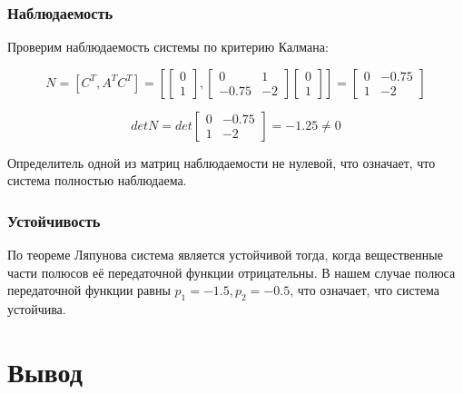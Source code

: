 \documentclass[14pt,a4paper,report]{report}
\begin{document}
\subsubsection{Наблюдаемость}

Проверим наблюдаемость системы по критерию Калмана:

\begin{equation*}
\text{$N=[C^T,A^TC^T]=[\begin{bmatrix} 0 \\ 1 \end{bmatrix},\begin{bmatrix} 0 & 1 \\ -0.75 & -2 \end{bmatrix}\begin{bmatrix} 0 \\ 1 \end{bmatrix}]=\begin{bmatrix} 0 & -0.75 \\ 1 & -2 \end{bmatrix}$}
\end{equation*}

\begin{equation*}
\text{$detN=det\begin{bmatrix} 0 & -0.75 \\ 1 & -2 \end{bmatrix}=-1.25\neq 0$}
\end{equation*}

Определитель одной из матриц наблюдаемости не нулевой, что означает, что система полностью наблюдаема.

\subsubsection{Устойчивость}

По теореме Ляпунова система является устойчивой тогда, когда вещественные части полюсов её передаточной функции отрицательны. В нашем случае полюса передаточной функции равны $p_1=-1.5, p_2=-0.5$, что означает, что система устойчива. 

\section{Вывод}
\end{document}
